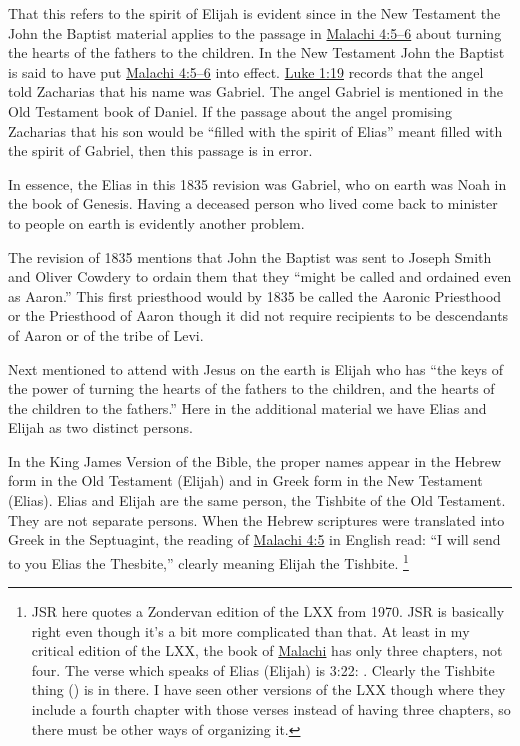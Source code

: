 		That this refers to the spirit of Elijah is evident since in the New Testament the John the Baptist material applies to the passage in \hyperref[MALACHI-4-5]{Malachi 4:5--6} about turning the hearts of the fathers to the children. In the New Testament John the Baptist is said to have put \hyperref[MALACHI-4-5]{Malachi 4:5--6} into effect. \hyperref[LUKE-1-19]{Luke 1:19} records that the angel told Zacharias that his name was Gabriel. The angel Gabriel is mentioned in the Old Testament book of Daniel. If the passage about the angel promising Zacharias that his son would be ``filled with the spirit of Elias'' meant filled with the spirit of Gabriel, then this passage is in error.

		In essence, the Elias in this 1835 revision was Gabriel, who on earth was Noah in the book of Genesis. Having a deceased person who lived come back to minister to people on earth is evidently another problem.

		The revision of 1835 mentions that John the Baptist was sent to Joseph Smith and Oliver Cowdery to ordain them that they ``might be called and ordained even as Aaron.'' This first priesthood would by 1835 be called the Aaronic Priesthood or the Priesthood of Aaron though it did not require recipients to be descendants of Aaron or of the tribe of Levi.

		Next mentioned to attend with Jesus on the earth is Elijah who has ``the keys of the power of turning the hearts of the fathers to the children, and the hearts of the children to the fathers.'' Here in the additional material we have Elias and Elijah as two distinct persons.

		In the King James Version of the Bible, the proper names appear in the Hebrew form in the Old Testament (Elijah) and in Greek form in the New Testament (Elias). Elias and Elijah are the same person, the Tishbite of the Old Testament. They are not separate persons. When the Hebrew scriptures were translated into Greek in the Septuagint, the reading of \hyperref[MALACHI-4-5]{Malachi 4:5} in English read: ``I will send to you Elias the Thesbite,'' clearly meaning Elijah the Tishbite.%
			\footnote{%
				JSR here quotes a Zondervan edition of the LXX from 1970. JSR is basically right even though it's a bit more complicated than that. At least in my critical edition of the LXX, the book of \hyperref[MALACHI]{Malachi} has only three chapters, not four. The verse which speaks of Elias (Elijah) is 3:22: . Clearly the Tishbite thing () is in there. I have seen other versions of the LXX though where they include a fourth chapter with those verses instead of having three chapters, so there must be other ways of organizing it.
				}

